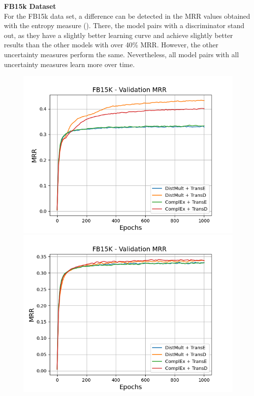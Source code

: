 \textbf{FB15k Dataset}
\label{subsubsec:metrics_fb15k}\\
%
For the FB15k data set, a difference can be detected in the MRR values obtained with the entropy measure ().
There, the model pairs with a \transd discriminator stand out, as they have a slightly better learning curve and achieve slightly better results than the other models with over 40\% MRR.
However, the other uncertainty measures perform the same.
Nevertheless, all model pairs with all uncertainty measures learn more over time.
\begin{figure}[H]
    \centering
    \begin{minipage}{.5\textwidth}
      \centering
      \includegraphics[width=0.9\linewidth]{figures/results/gan_train/not_pretrained/uncertainty/max_distribution/entropy/fb15k/1k_epochs/uncertainty_fb15k_mrrs.png}
    \end{minipage}%
    \begin{minipage}{.5\textwidth}
      \centering
      \includegraphics[width=0.9\linewidth]{figures/results/gan_train/not_pretrained/uncertainty/max_distribution/least_confidence/fb15k/uncertainty_fb15k_mrrs.png}

\end{minipage}
\end{figure}
